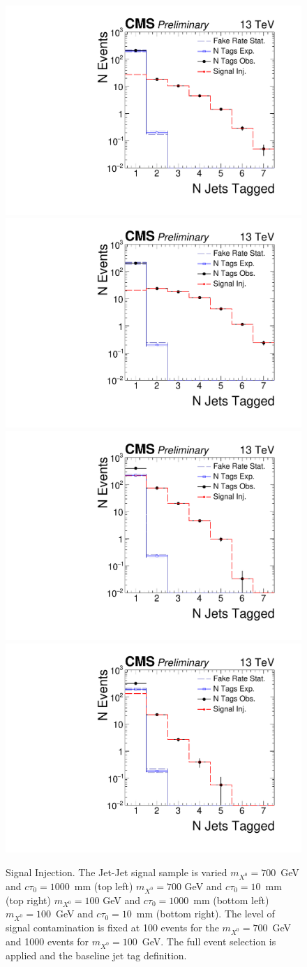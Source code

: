 \begin{figure}
\begin{center}
\includegraphics[width=.45\textwidth]{figures/an/ANALYSIS/76x_pu/INJECTION/mx700_ctau1000mm_100ev.pdf}
\includegraphics[width=.45\textwidth]{figures/an/ANALYSIS/76x_pu/INJECTION/qcd_loose_displacedEvtSel_100eV.pdf}\\
\includegraphics[width=.45\textwidth]{figures/an/ANALYSIS/76x_pu/INJECTION/mx100_ctau10mm_1000ev.pdf}
\includegraphics[width=.45\textwidth]{figures/an/ANALYSIS/76x_pu/INJECTION/mx100_ctau1000mm_1000ev.pdf}\\
\caption{Signal Injection. The Jet-Jet signal sample is varied $m_{X^0}=700$~GeV and $c\tau_0=1000$~mm (top left) 
$m_{X^0}=700$ GeV and $c\tau_0=10$~mm (top right) $m_{X^0}=100$ GeV and $c\tau_0=1000$~mm (bottom left) $m_{X^0}=100$~GeV and $c\tau_0=10$~mm (bottom right).
The level of signal contamination is fixed at 100 events for the $m_{X^0}=700$~GeV and 1000 events for $m_{X^0}=100$~GeV. The full 
event selection is applied and the baseline jet tag definition.  
\label{fig:injection_100gev_700gev_100ev}}
\end{center}
\end{figure}


